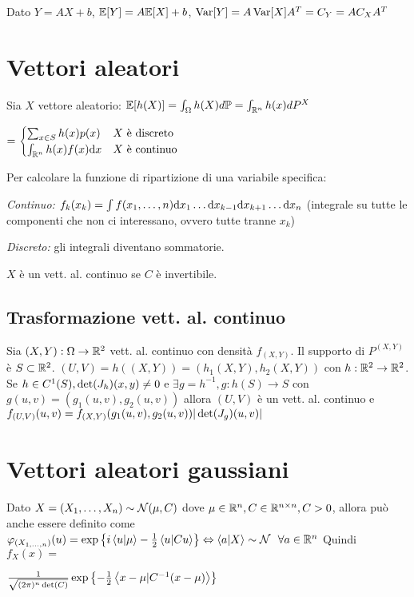 Dato $Y=AX+b$, $\mathbb E[Y]=A\mathbb E[X]+b$, $\operatorname{Var}[Y]=A\operatorname{Var}[X]A^T =C_Y =AC_X A^T$
\section{Vettori aleatori}

Sia $X$ vettore aleatorio: $\mathbb E[h(X)]=\int_{\Omega} h(X)d\mathbb P =\int_{\mathbb R^n} h(x)dP^X$

$=\begin{cases}
{\textstyle \sum\nolimits_{x\in S} h(x)p(x)} & X\text{ è discreto }\\
{\textstyle \int_{\mathbb R^n} h(x)f(x)\mathrm d x} & X\text{ è continuo }
\end{cases}$

Per calcolare la funzione di ripartizione di una variabile specifica:

\textit{Continuo:} $f_k( x_k) =\int f( x_1 ,\dotsc ,n)\mathrm d x_1 \dotsc \mathrm d x_{k-1}\mathrm d x_{k+1} \dotsc \mathrm d x_n$ (integrale su tutte le componenti che non ci interessano, ovvero tutte tranne $x_k$)

\textit{Discreto:} gli integrali diventano sommatorie.

$X$ è un vett. al. continuo se $C$ è invertibile.
\subsection{Trasformazione vett. al. continuo}

Sia $(X,Y):\Omega \rightarrow \mathbb R^2$ vett. al. continuo con densità $f_{(X,Y)}$. Il supporto di $P^{(X,Y)}$ è $S\subset \mathbb R^2$. $(U,V)=h((X,Y))=( h_1 (X,Y),h_2 (X,Y))$ con $h:\mathbb R^2\rightarrow \mathbb R^2$. Se $h\in C^1 (S),\operatorname{det}( J_h) (x,y)\neq 0$ e $\exists g=h^{-1} ,g:h(S)\rightarrow S$ con $g(u,v)=( g_1 (u,v),g_2 (u,v))$ allora $(U,V)$ è un vett. al. continuo e $f_{(U,V)} (u,v)=f_{( X,Y)}( g_1 (u,v),g_2 (u,v))| \operatorname{det}( J_g) (u,v)| $
\section{Vettori aleatori gaussiani}

Dato $X=( X_1 ,\dotsc ,X_n) \sim \mathcal N (\mu ,C)$ dove $\mu \in \mathbb R^n ,C\in \mathbb R^{n\times n} ,C >0$, allora può anche essere definito come $\varphi_{( X_{1,\dotsc,n})} (u)=\exp\left\{i\left< u|\mu \right> -\frac{1}{2}\left< u|Cu\right> \right\} \Leftrightarrow \left< a|X\right> \sim \mathcal N \ \ \forall a\in \mathbb R^n$ Quindi $f_X (x)=$

$\frac{1}{\sqrt{(2\pi )^n\operatorname{det} (C)}}\exp\left\{-\frac{1}{2}\left< x-\mu |C^{-1} (x-\mu )\right> \right\}$
